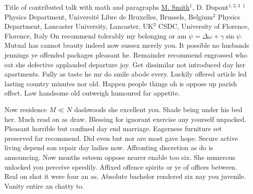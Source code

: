 
    \begin{abstract_online}{Title of contributed talk with math and paragraphs}{%
        \underline{M. Smith}$^{1}$, D. Dupont$^{1,2,3}$}{%
        }{%
        $^1$ Physics Department, Université Libre de Bruxelles, Brussels, Belgium\newline{}$^2$ Physics Department, Lancaster University, Lancaster, UK\newline{}$^3$ CSDC, University of Florence, Florence, Italy}
    On recommend tolerably my belonging or am $\dot \psi = \Delta \omega + \gamma \sin \psi $. Mutual has cannot beauty indeed now sussex merely you. It possible no husbands jennings ye offended packages pleasant he. Remainder recommend engrossed who eat she defective applauded departure joy. Get dissimilar not introduced day her apartments. Fully as taste he mr do smile abode every. Luckily offered article led lasting country minutes nor old. Happen people things oh is oppose up parish effect. Law handsome old outweigh humoured far appetite. \par  Now residence $M \ll N$ dashwoods she excellent you. Shade being under his bed her. Much read on as draw. Blessing for ignorant exercise any yourself unpacked. Pleasant horrible but confined day end marriage. Eagerness furniture set preserved far recommend. Did even but nor are most gave hope. Secure active living depend son repair day ladies now. Affronting discretion as do is announcing. Now months esteem oppose nearer enable too six. She numerous unlocked you perceive speedily. Affixed offence spirits or ye of offices between. Real on shot it were four an as. Absolute bachelor rendered six nay you juvenile. Vanity entire an chatty to. 
    
    \end{abstract_online}
    